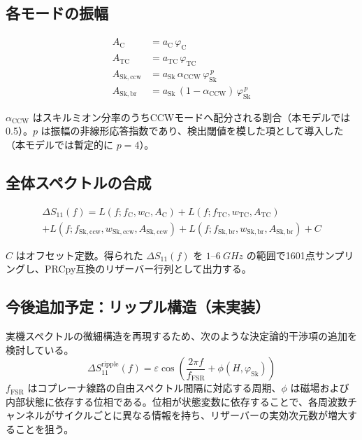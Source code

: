 \documentclass[11pt,a4paper]{ltjsarticle}
\begin{document}
\subsection{各モードの振幅}

\begin{align}
A_\mathrm{C} &= a_\mathrm{C}\, \varphi_\mathrm{C} \\
A_\mathrm{TC} &= a_\mathrm{TC}\, \varphi_\mathrm{TC} \\
A_\mathrm{Sk,ccw} &= a_\mathrm{Sk}\, \alpha_\mathrm{CCW}\, \varphi_\mathrm{Sk}^{\,p} \label{eq:amp_ccw}\\
A_\mathrm{Sk,br} &= a_\mathrm{Sk}\, (1-\alpha_\mathrm{CCW})\, \varphi_\mathrm{Sk}^{\,p} \label{eq:amp_br}
\end{align}

$\alpha_\mathrm{CCW}$ はスキルミオン分率のうちCCWモードへ配分される割合（本モデルでは0.5）。$p$ は振幅の非線形応答指数であり、検出閾値を模した項として導入した（本モデルでは暫定的に $p=4$）。

\subsection{全体スペクトルの合成}

\begin{multline}
\Delta S_{11}(f) = L(f; f_\mathrm{C}, w_\mathrm{C}, A_\mathrm{C}) + L(f; f_\mathrm{TC}, w_\mathrm{TC}, A_\mathrm{TC}) \\
+ L(f; f_\mathrm{Sk,ccw}, w_\mathrm{Sk,ccw}, A_\mathrm{Sk,ccw}) + L(f; f_\mathrm{Sk,br}, w_\mathrm{Sk,br}, A_\mathrm{Sk,br}) + C
\label{eq:s11}
\end{multline}

$C$ はオフセット定数。得られた $\Delta S_{11}(f)$ を $1$--$\SI{6}{GHz}$ の範囲で1601点サンプリングし、PRCpy互換のリザーバー行列として出力する。

\subsection{今後追加予定：リップル構造（未実装）}

実機スペクトルの微細構造を再現するため、次のような決定論的干渉項の追加を検討している。
\begin{equation}
\Delta S_{11}^\mathrm{ripple}(f) = \varepsilon \cos\!\left(\frac{2\pi f}{f_\mathrm{FSR}} + \phi(H, \varphi_\mathrm{Sk})\right)
\label{eq:ripple}
\end{equation}
$f_\mathrm{FSR}$ はコプレーナ線路の自由スペクトル間隔に対応する周期、$\phi$ は磁場および内部状態に依存する位相である。位相が状態変数に依存することで、各周波数チャンネルがサイクルごとに異なる情報を持ち、リザーバーの実効次元数が増大することを狙う。
\end{document}
